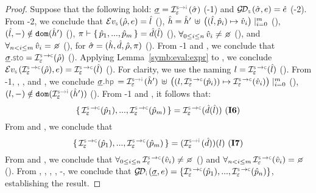 \begin{proof}
Suppose that the following hold: 
$\istate = \interpret{\symbinst}{\senv}(\sstate)$ (\hyp{1}) and $\absgetdomainfun{\symbolic}(\sstate, \jsilexpr) = \sexpr$ (\hyp{2}). 
From \hyp{2}, we conclude that 
$\evalexpr{\symbolic}(\sstore, \jsilexpr) = \sloc$ (), 
$\hat{h} = \hat{h}' \, \uplus \, \big((\hat{l}, \hat{p}_i) \mapsto \hat{v}_i \big)\mid_{i = 0}^m$ (), 
$(\hat{l},-) \notin \texttt{dom} (\hat{h}')$ (), 
$\pi \vdash \{ \, \hat{p}_1, ..., \hat{p}_m \, \} = \hat{d}(\hat{l})$ (), 
$\forall_{0 \leq i \leq n} \, \sexprv_i \neq \none$ (), 
and $\forall_{n < i \leq m} \, \sexprv_i = \none$ (), for $\hat{\sigma} = (\hat{h}, \hat{d}, \hat\rho, \pi)$ (). 
From \hyp{1} and , we conclude that $\istate.\stosel = \interpret{\symbconc}{\senv}(\sstore)$ (). 
 Applying Lemma~\ref{symb:eval:expr} to , we conclude 
 $\evalexpr{\symbolic}(\interpret{\symbconc}{\senv}(\sstore), \jsilexpr) = \interpret{\symbconc}{\senv}(\sloc)$ (). 
 For clarity, we use the naming $\loc = \interpret{\symbconc}{\senv}(\sloc)$ (). 
 From \hyp{1}, , , and , we conclude 
 $\istate.\hpsel =  \interpret{\symbinst}{\senv}(\sheap') \, \uplus \, \big((\loc, \interpret{\symbconc}{\senv}(\sexprp_i)) \mapsto \interpret{\symbconc}{\senv}(\sexprv_i) \big)\mid_{i = 0}^m$ (), 
$(\loc,-) \notin \domain (\interpret{\symbinst}{\senv}(\sheap'))$ ().
From \hyp{1} and , it follows that: 
$$\jsilset{\interpret{\symbconc}{\senv}(\sexprp_1), ..., \interpret{\symbconc}{\senv}(\sexprp_m)} = \interpret{\symbconc}{\senv}(\sdom(\sloc)) \text{ (\ieq{6})}$$
From  and , we conclude that 
 $$\jsilset{\interpret{\symbconc}{\senv}(\sexprp_1), ..., \interpret{\symbconc}{\senv}(\sexprp_m)} = (\interpret{\symbinst}{\senv}(\sdom))(\loc) \text{ (\ieq{7})}$$ 
 From  and , we conclude that 
 {\small $\forall_{0 \leq i \leq n} \, \interpret{\symbconc}{\senv}(\sexprv_i) \neq \none$} () and  
{\small $\forall_{n < i \leq m} \, \interpret{\symbconc}{\senv}(\sexprv_i) = \none$} ().
From , , , , -, we conclude that 
$\absgetdomainfun{\instrumented}(\istate, \jsilexpr) = \{ \interpret{\symbconc}{\senv}(\sexprp_1), ..., \interpret{\symbconc}{\senv}(\sexprp_n) \}$, 
establishing the result. 
\end{proof}


